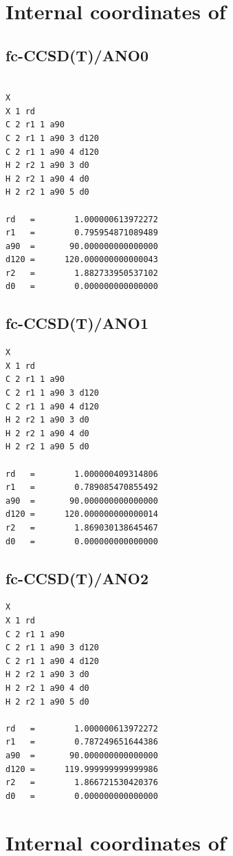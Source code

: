 \section{Internal coordinates of \texorpdfstring{\cyc}{c-c3h3+} }
\subsection{fc-CCSD(T)/ANO0}
\begin{verbatim}

X
X 1 rd
C 2 r1 1 a90
C 2 r1 1 a90 3 d120
C 2 r1 1 a90 4 d120
H 2 r2 1 a90 3 d0
H 2 r2 1 a90 4 d0
H 2 r2 1 a90 5 d0

rd   =        1.000000613972272
r1   =        0.795954871089489
a90  =       90.000000000000000
d120 =      120.000000000000043
r2   =        1.882733950537102
d0   =        0.000000000000000
\end{verbatim}
    
\subsection{fc-CCSD(T)/ANO1}
\begin{verbatim}
X
X 1 rd
C 2 r1 1 a90
C 2 r1 1 a90 3 d120
C 2 r1 1 a90 4 d120
H 2 r2 1 a90 3 d0
H 2 r2 1 a90 4 d0
H 2 r2 1 a90 5 d0

rd   =        1.000000409314806
r1   =        0.789085470855492
a90  =       90.000000000000000
d120 =      120.000000000000014
r2   =        1.869030138645467
d0   =        0.000000000000000
\end{verbatim}

\subsection{fc-CCSD(T)/ANO2}

\begin{verbatim}
X
X 1 rd
C 2 r1 1 a90
C 2 r1 1 a90 3 d120
C 2 r1 1 a90 4 d120
H 2 r2 1 a90 3 d0
H 2 r2 1 a90 4 d0
H 2 r2 1 a90 5 d0

rd   =        1.000000613972272
r1   =        0.787249651644386
a90  =       90.000000000000000
d120 =      119.999999999999986
r2   =        1.866721530420376
d0   =        0.000000000000000
\end{verbatim}

\section{Internal coordinates of \texorpdfstring{\lin}{l-c3h3+} }

